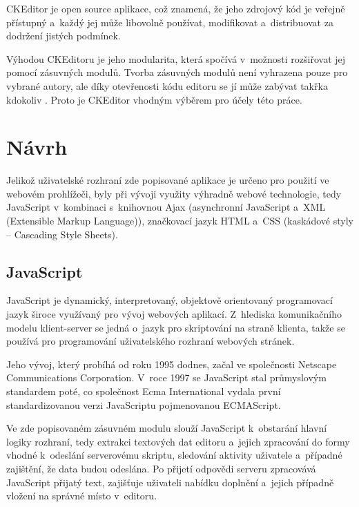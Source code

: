 \documentclass[a4paper,11pt,openany]{book} %
\begin{document}
CKEditor je open source aplikace, což znamená, že jeho zdrojový kód je veřejně přístupný a~každý jej může libovolně používat, modifikovat a~distribuovat za dodržení jistých podmínek. 

Výhodou CKEditoru je jeho modularita, která spočívá v~možnosti rozšiřovat jej pomocí zásuvných modulů. Tvorba zásuvných modulů není vyhrazena pouze pro vybrané autory, ale  díky otevřenosti kódu editoru se jí může zabývat takřka kdokoliv \parencite{cksource2015}. Proto je CKEditor vhodným výběrem pro účely této práce. %

\chapter{Návrh}\label{navrh}

Jelikož uživatelské rozhraní zde popisované aplikace je určeno pro použití ve webovém prohlížeči, byly při vývoji využity výhradně webové technologie, tedy JavaScript v~kombinaci s~knihovnou Ajax (asynchronní JavaScript a~XML (Extensible Markup Language)), značkovací jazyk HTML a~CSS (kaskádové styly -- Cascading Style Sheets). 

\section{JavaScript}

JavaScript je dynamický, interpretovaný, objektově orientovaný programovací jazyk široce využívaný pro vývoj webových aplikací. Z~hlediska komunikačního modelu klient-server se jedná o~jazyk pro skriptování na straně klienta, takže se používá pro programování uživatelského rozhraní webových stránek. \parencite[2--4]{flanagan2006javascript} %


Jeho vývoj, který probíhá od roku 1995 dodnes, začal ve společnosti Netscape Communications Corporation. V~roce 1997 se JavaScript stal průmyslovým standardem poté, co společnost Ecma International vydala první standardizovanou verzi JavaScriptu pojmenovanou ECMAScript. \parencite{brendaneich2011} %

Ve zde popisovaném zásuvném modulu slouží JavaScript k~obstarání hlavní logiky rozhraní, tedy extrakci textových dat editoru a~jejich zpracování do formy vhodné k~odeslání serverovému skriptu, sledování aktivity uživatele a~případné zajištění, že data budou odeslána. Po přijetí odpovědi serveru zpracovává JavaScript přijatý text, zajišťuje uživateli nabídku doplnění a~jejich případně vložení na správné místo v~editoru. 
\end{document}
